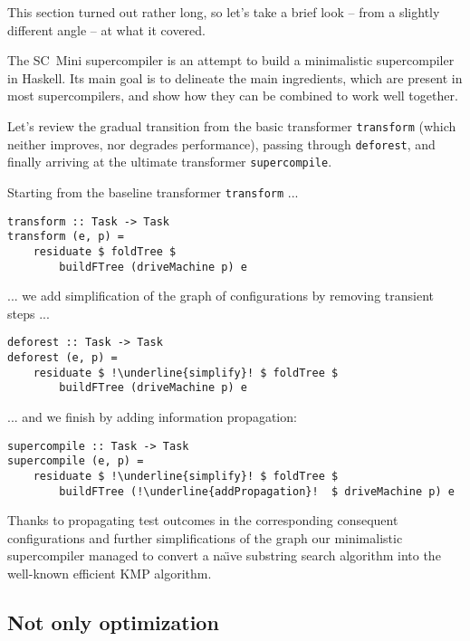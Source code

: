 This section turned out rather long, so let's take a brief look -- from 
a slightly different angle -- at what it covered.

The SC~Mini supercompiler is an attempt to build a minimalistic supercompiler in Haskell.
Its main goal is to delineate the main ingredients, which are present in most supercompilers,
and show how they can be combined to work well together.

Let's review the gradual transition from the basic transformer \texttt{transform}
(which neither improves, nor degrades performance), passing through \texttt{deforest},
and finally arriving at the ultimate transformer \texttt{supercompile}.

\noindent Starting from the baseline transformer \texttt{transform} ...
\begin{lstlisting}[escapechar=!]
transform :: Task -> Task
transform (e, p) =
	residuate $ foldTree $
		buildFTree (driveMachine p) e
\end{lstlisting}
... we add simplification of the graph of configurations by removing transient steps ...
\begin{lstlisting}[escapechar=!]
deforest :: Task -> Task
deforest (e, p) =
	residuate $ !\underline{simplify}! $ foldTree $
    	buildFTree (driveMachine p) e
\end{lstlisting}
... and we finish by adding information propagation:
\begin{lstlisting}[escapechar=!]
supercompile :: Task -> Task
supercompile (e, p) =
	residuate $ !\underline{simplify}! $ foldTree $
		buildFTree (!\underline{addPropagation}!  $ driveMachine p) e
\end{lstlisting}

Thanks to propagating test outcomes in the corresponding consequent configurations
and further simplifications of the graph our minimalistic supercompiler
managed to convert a na\"{\i}ve substring search algorithm into the well-known
efficient KMP algorithm.

\subsection{Not only optimization}

